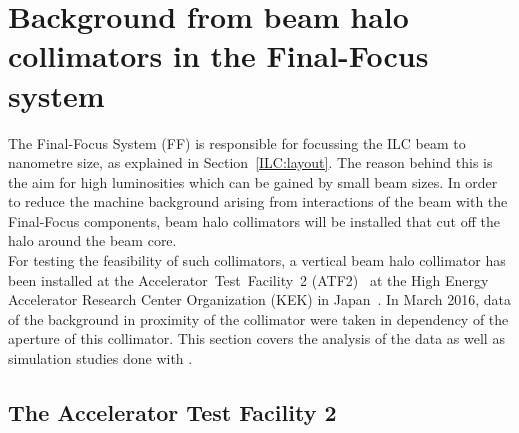 \section{Background from beam halo collimators in the Final-Focus system}

The Final-Focus System (FF) is responsible for focussing the ILC beam to nanometre size,  as explained in Section~\ref{ILC:layout}. 
The reason behind this is the aim for high luminosities which can be gained by small beam sizes.
In order to reduce the machine background arising from interactions of the beam with the Final-Focus components, beam halo collimators will be installed that cut off the halo around the beam core. 
\\For testing the feasibility of such collimators, a vertical beam halo collimator has been installed at the \mbox{Accelerator Test Facility 2} (ATF2)~\cite{ATF} at the High Energy Accelerator Research Center Organization (KEK) in Japan~\cite{Nuria_Thesis}. 
In March 2016, data of the background in proximity of the collimator were taken in dependency of the aperture of this collimator. 
This section covers the analysis of the data as well as simulation studies done with \bdsim.

\subsection{The Accelerator Test Facility 2}
\label{ATF2}

